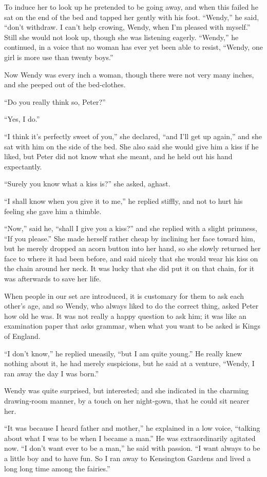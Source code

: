 To induce her to look up he pretended to be going away,
and when this failed he sat on the end of the bed and tapped her gently with his foot.
“Wendy,” he said, “don’t withdraw.
I can’t help crowing, Wendy, when I’m pleased with myself.”
Still she would not look up, though she was listening eagerly.
“Wendy,” he continued, in a voice that no woman has ever yet been able to resist,
“Wendy, one girl is more use than twenty boys.”

Now Wendy was every inch a woman,
though there were not very many inches,
and she peeped out of the bed‐clothes.

“Do you really think so, Peter?”

“Yes, I do.”

“I think it’s perfectly sweet of you,” she declared, “and I’ll get up again,”
and she sat with him on the side of the bed.
She also said she would give him a kiss if he liked,
but Peter did not know what she meant, and he held out his hand expectantly.

“Surely you know what a kiss is?\@” she asked, aghast.

“I shall know when you give it to me,” he replied stiffly,
and not to hurt his feeling she gave him a thimble.

“Now,” said he, “shall I give you a kiss?\@”
and she replied with a slight primness, “If you please.”
She made herself rather cheap by inclining her face toward him,
but he merely dropped an acorn button into her hand,
so she slowly returned her face to where it had been before,
and said nicely that she would wear his kiss on the chain around her neck.
It was lucky that she did put it on that chain, for it was afterwards to save her life.

When people in our set are introduced, it is customary for them to ask each other’s age,
and so Wendy, who always liked to do the correct thing, asked Peter how old he was.
It was not really a happy question to ask him;
it was like an examination paper that asks grammar,
when what you want to be asked is Kings of England.

“I don’t know,” he replied uneasily, “but I am quite young.”
He really knew nothing about it, he had merely suspicions,
but he said at a venture, “Wendy, I ran away the day I was born.”

Wendy was quite surprised, but interested;
and she indicated in the charming drawing‐room manner, by a touch on her night‐gown,
that he could sit nearer her.

“It was because I heard father and mother,” he explained in a low voice,
“talking about what I was to be when I became a man.”
He was extraordinarily agitated now.
“I don’t want ever to be a man,” he said with passion.
“I want always to be a little boy and to have fun.
So I ran away to Kensington Gardens and lived a long long time among the fairies.”

